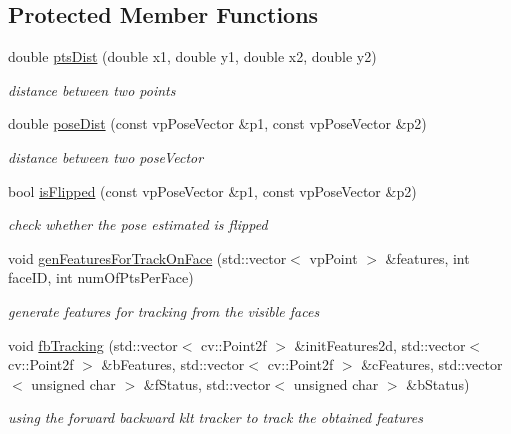 \subsection*{\-Protected \-Member \-Functions}
\begin{DoxyCompactItemize}
\item 
double \hyperlink{classkltFbTracker_afea81d8ad4d23b8162d4bcf8d0ccab37}{pts\-Dist} (double x1, double y1, double x2, double y2)
\begin{DoxyCompactList}\small\item\em distance between two points \end{DoxyCompactList}\item 
double \hyperlink{classkltFbTracker_aa87fc08d64e0e4f60ef2b7ce73cb25e8}{pose\-Dist} (const vp\-Pose\-Vector \&p1, const vp\-Pose\-Vector \&p2)
\begin{DoxyCompactList}\small\item\em distance between two pose\-Vector \end{DoxyCompactList}\item 
bool \hyperlink{classkltFbTracker_a323a5591070b2b96caf99588f8a1222e}{is\-Flipped} (const vp\-Pose\-Vector \&p1, const vp\-Pose\-Vector \&p2)
\begin{DoxyCompactList}\small\item\em check whether the pose estimated is flipped \end{DoxyCompactList}\item 
void \hyperlink{classkltFbTracker_a709489510926fb6cd8a47b880cc4cdc3}{gen\-Features\-For\-Track\-On\-Face} (std\-::vector$<$ vp\-Point $>$ \&features, int face\-I\-D, int num\-Of\-Pts\-Per\-Face)
\begin{DoxyCompactList}\small\item\em generate features for tracking from the visible faces \end{DoxyCompactList}\item 
void \hyperlink{classkltFbTracker_a7c36cfa21a75b136d2275601cc1af8ad}{fb\-Tracking} (std\-::vector$<$ cv\-::\-Point2f $>$ \&init\-Features2d, std\-::vector$<$ cv\-::\-Point2f $>$ \&b\-Features, std\-::vector$<$ cv\-::\-Point2f $>$ \&c\-Features, std\-::vector$<$ unsigned char $>$ \&f\-Status, std\-::vector$<$ unsigned char $>$ \&b\-Status)
\begin{DoxyCompactList}\small\item\em using the forward backward klt tracker to track the obtained features \end{DoxyCompactList}\item 

\end{DoxyCompactItemize}
